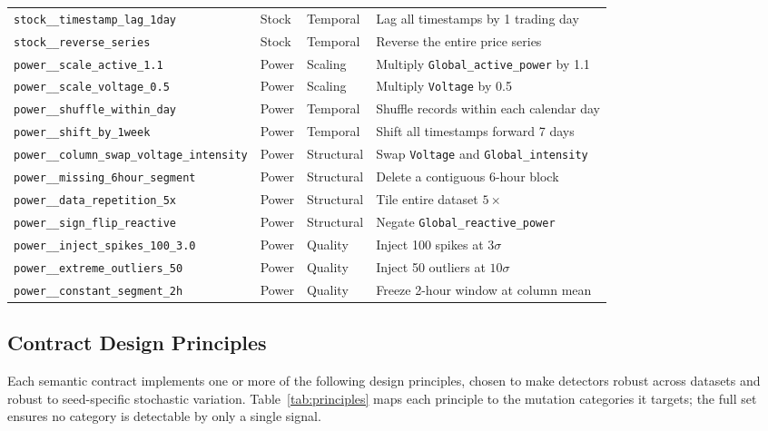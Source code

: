 \documentclass[journal]{IEEEtran}
\newcommand{\mut}[1]{\mbox{\texttt{#1}}}
\begin{document}
\begin{table}[!t]
\begin{tabular}{llll}
\mut{stock\_\_timestamp\_lag\_1day}      & Stock   & Temporal     & Lag all timestamps by 1 trading day \\
\mut{stock\_\_reverse\_series}           & Stock   & Temporal     & Reverse the entire price series \\
\midrule
\mut{power\_\_scale\_active\_1.1}              & Power & Scaling    & Multiply \texttt{Global\_active\_power} by 1.1 \\
\mut{power\_\_scale\_voltage\_0.5}             & Power & Scaling    & Multiply \texttt{Voltage} by 0.5 \\
\mut{power\_\_shuffle\_within\_day}            & Power & Temporal   & Shuffle records within each calendar day \\
\mut{power\_\_shift\_by\_1week}                & Power & Temporal   & Shift all timestamps forward 7 days \\
\mut{power\_\_column\_swap\_voltage\_intensity}& Power & Structural & Swap \texttt{Voltage} and \texttt{Global\_intensity} \\
\mut{power\_\_missing\_6hour\_segment}         & Power & Structural & Delete a contiguous 6-hour block \\
\mut{power\_\_data\_repetition\_5x}            & Power & Structural & Tile entire dataset $5\times$ \\
\mut{power\_\_sign\_flip\_reactive}            & Power & Structural & Negate \texttt{Global\_reactive\_power} \\
\mut{power\_\_inject\_spikes\_100\_3.0}        & Power & Quality    & Inject 100 spikes at $3\sigma$ \\
\mut{power\_\_extreme\_outliers\_50}           & Power & Quality    & Inject 50 outliers at $10\sigma$ \\
\mut{power\_\_constant\_segment\_2h}           & Power & Quality    & Freeze 2-hour window at column mean \\
\bottomrule
\end{tabular}
\end{table}

\subsection{Contract Design Principles}

Each semantic contract implements one or more of the following design
principles, chosen to make detectors robust across datasets and robust to
seed-specific stochastic variation.
Table~\ref{tab:principles} maps each principle to the mutation categories it
targets; the full set ensures no category is detectable by only a single
signal.
\end{document}
